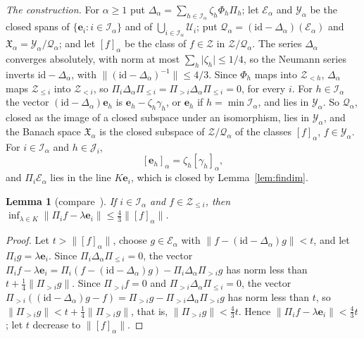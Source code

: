 \documentclass[11pt]{amsart}
\newtheorem{lemma}[theorem]{Lemma}
\theoremstyle{definition}
\theoremstyle{remark}
\numberwithin{equation}{section}
\newcommand{\id}{\mathrm{id}}
\newcommand{\abs}[1]{\lvert #1\rvert}
\newcommand{\norm}[1]{\lVert #1\rVert}
\theoremstyle{plain}
\theoremstyle{definition}
\theoremstyle{plain}
\newcommand{\fX}{\mathfrak X}
\begin{document}
\emph{The construction.} For $\alpha\ge1$ put $\Delta_\alpha=\sum_{h\in\mathcal I_\alpha}\zeta_h\Phi_h\Pi_h$; let
$\mathcal E_\alpha$ and $\mathcal Y_\alpha$ be the closed spans of $\{\mathbf e_i:i\in\mathcal I_\alpha\}$ and of
$\bigcup_{i\in\mathcal I_\alpha}\mathcal U_i$; put $\mathcal Q_\alpha=(\id-\Delta_\alpha)(\mathcal E_\alpha)$ and
$\fX_\alpha=\mathcal Y_\alpha/\mathcal Q_\alpha$; and let $[f]_\alpha$ be the class of $f\in\mathcal Z$ in
$\mathcal Z/\mathcal Q_\alpha$. The series $\Delta_\alpha$ converges absolutely, with norm at most
$\sum_h\abs{\zeta_h}\le1/4$, so the Neumann series inverts $\id-\Delta_\alpha$, with
$\norm{(\id-\Delta_\alpha)^{-1}}\le4/3$. Since $\Phi_h$ maps into $\mathcal Z_{<h}$, $\Delta_\alpha$ maps
$\mathcal Z_{\le i}$ into $\mathcal Z_{<i}$, so $\Pi_i\Delta_\alpha\Pi_{\le i}=\Pi_{>i}\Delta_\alpha\Pi_{\le i}=0$, for
every $i$. For $h\in\mathcal I_\alpha$ the vector $(\id-\Delta_\alpha)\mathbf e_h$ is $\mathbf e_h-\zeta_h\gamma_h$, or
$\mathbf e_h$ if $h=\min\mathcal I_\alpha$, and lies in $\mathcal Y_\alpha$. So $\mathcal Q_\alpha$, closed as the image
of a closed subspace under an isomorphism, lies in $\mathcal Y_\alpha$, and the Banach space $\fX_\alpha$ is the closed
subspace of $\mathcal Z/\mathcal Q_\alpha$ of the classes $[f]_\alpha$, $f\in\mathcal Y_\alpha$. For $i\in\mathcal I_\alpha$ and $h\in\mathcal J_i$,
\begin{equation}\label{rig:eq:quotient}
 [\mathbf e_h]_\alpha=\zeta_h[\gamma_h]_\alpha ,
\end{equation}
and $\Pi_i\mathcal E_\alpha$ lies in the line $K\mathbf e_i$, which is closed by Lemma~\ref{lem:findim}.

\begin{lemma}[compare~{\cite[Lemma~3.3]{KR}}]\label{rig:lem:projection}
If $i\in\mathcal I_\alpha$ and $f\in\mathcal Z_{\le i}$, then
$\inf_{\lambda\in K}\norm{\Pi_if-\lambda\mathbf e_i}\le\frac43\norm{[f]_\alpha}$.
\end{lemma}

\begin{proof}
Let $t>\norm{[f]_\alpha}$, choose $g\in\mathcal E_\alpha$ with $\norm{f-(\id-\Delta_\alpha)g}<t$, and let
$\Pi_ig=\lambda\mathbf e_i$. Since $\Pi_i\Delta_\alpha\Pi_{\le i}=0$, the vector
$\Pi_if-\lambda\mathbf e_i=\Pi_i(f-(\id-\Delta_\alpha)g)-\Pi_i\Delta_\alpha\Pi_{>i}g$ has norm less than
$t+\frac14\norm{\Pi_{>i}g}$. Since $\Pi_{>i}f=0$ and $\Pi_{>i}\Delta_\alpha\Pi_{\le i}=0$, the vector
$\Pi_{>i}((\id-\Delta_\alpha)g-f)=\Pi_{>i}g-\Pi_{>i}\Delta_\alpha\Pi_{>i}g$ has norm less than $t$, so
$\norm{\Pi_{>i}g}<t+\frac14\norm{\Pi_{>i}g}$, that is, $\norm{\Pi_{>i}g}<\frac43t$. Hence
$\norm{\Pi_if-\lambda\mathbf e_i}<\frac43t$; let $t$ decrease to $\norm{[f]_\alpha}$.
\end{proof}
\end{document}

